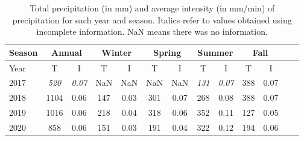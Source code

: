 \begin{table}[t]
  \begin{center}
    \begin{tabular}{|l|*{11}{c|}r|}
      \hline
      Season    &       \multicolumn{2}{|c|}{Annual}          & \multicolumn{2}{|c|}{Winter}& \multicolumn{2}{|c|}{Spring}  & \multicolumn{2}{|c|}{Summer} &\multicolumn{2}{|c|}{Fall}  \\
      \hline
      Year      & T & I  & T & I  & T & I  & T & I  & T & I \\
      \hline
      2017      & \textit{520}  & \textit{0.07}  & NaN & NaN & NaN & NaN & \textit{131}  & \textit{0.07}  & 388  & 0.07  \\
      2018      & 1104           & 0.06  & 147 & 0.03 & 301 & 0.07 & 268  & 0.08  & 388 & 0.07  \\
      2019      & 1016           & 0.06  & 218  & 0.04 & 318 & 0.06 & 352 & 0.11  & 127 &  0.05 \\
      2020      & 858          & 0.06   & 151  & 0.03 & 191  & 0.04 & 322  & 0.12 & 194 & 0.06\\
      \hline
    \end{tabular}
  \end{center}
  \caption[Summary of total precipitation and
    intensity]{\label{secondtable}Total precipitation (in mm) and average
    intensity (in mm/min) of precipitation for each year and season. Italics
    refer to values obtained using incomplete information. NaN means there
    was no information.}
\end{table}
